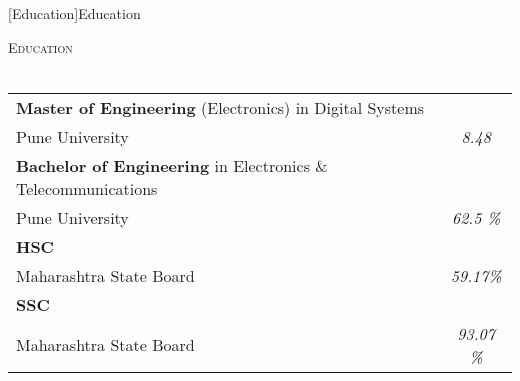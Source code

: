 \documentclass[a4paper]{article}
\newcommand{\lineunder} {
    \vspace*{-8pt} \\
    \hspace*{-18pt} \hrulefill \\
}
\newcommand{\header} [1] {
    {\hspace*{-18pt}\vspace*{6pt} \textsc{#1}}
    \vspace*{-6pt} \lineunder
}
\begin{document}
[Education]{Education}
\header{Education}
\vspace{1mm}
\bgroup
\def\arraystretch{1.2}
\begin{tabularx}{\textwidth}{ | X | c | }
	\hline

	\textbf{Master of Engineering} (Electronics) in Digital Systems       &                   \\
	Pune University                                                       & \textit{8.48}     \\
	\hline

	\textbf{Bachelor of Engineering} in Electronics \& Telecommunications &                   \\
	Pune University                                                       & \textit{62.5 \%}  \\
	\hline

	\textbf{HSC}                                                          &                   \\
	Maharashtra State Board                                               & \textit{59.17\%}  \\
	\hline

	\textbf{SSC}                                                          &                   \\
	Maharashtra State Board                                               & \textit{93.07 \%} \\
	\hline
\end{tabularx}
\egroup
\vspace{2mm}
\end{document}
